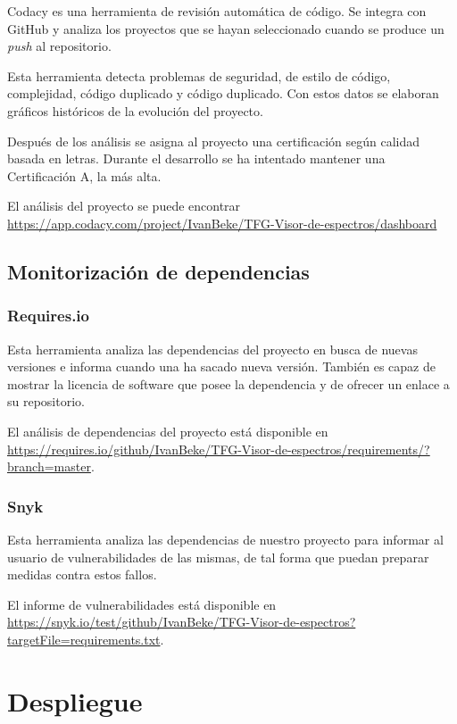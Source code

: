 Codacy es una herramienta de revisión automática de código. Se integra con
GitHub y analiza los proyectos que se hayan seleccionado cuando se produce un
\textit{push} al repositorio.

Esta herramienta detecta problemas de seguridad, de estilo de código,
complejidad, código duplicado y código duplicado. Con estos datos se elaboran
gráficos históricos de la evolución del proyecto.

Después de los análisis se asigna al proyecto una certificación según calidad
basada en letras. Durante el desarrollo se ha intentado mantener una
Certificación A, la más alta. 

El análisis del proyecto se puede encontrar
\url{https://app.codacy.com/project/IvanBeke/TFG-Visor-de-espectros/dashboard}

\subsection{Monitorización de dependencias}

\subsubsection{Requires.io}

Esta herramienta analiza las dependencias del proyecto en busca de nuevas
versiones e informa cuando una ha sacado nueva versión. También es capaz de
mostrar la licencia de software que posee la dependencia y de ofrecer un enlace
a su repositorio.

El análisis de dependencias del proyecto está disponible en
\url{https://requires.io/github/IvanBeke/TFG-Visor-de-espectros/requirements/?branch=master}.

\subsubsection{Snyk}

Esta herramienta analiza las dependencias de nuestro proyecto para informar al
usuario de vulnerabilidades de las mismas, de tal forma que puedan preparar
medidas contra estos fallos.

El informe de vulnerabilidades está disponible en
\url{https://snyk.io/test/github/IvanBeke/TFG-Visor-de-espectros?targetFile=requirements.txt}.

\section{Despliegue}

